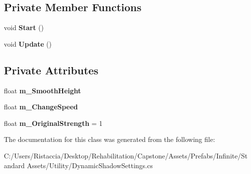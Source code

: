 \subsection*{Private Member Functions}
\begin{DoxyCompactItemize}
\item 
\mbox{\label{class_unity_standard_assets_1_1_utility_1_1_dynamic_shadow_settings_ac1f62e4c76152f36c1fc8b8136231a58}} 
void {\bfseries Start} ()
\item 
\mbox{\label{class_unity_standard_assets_1_1_utility_1_1_dynamic_shadow_settings_a9b0f224d3b26f1d2c0ffd986ab911f85}} 
void {\bfseries Update} ()
\end{DoxyCompactItemize}
\subsection*{Private Attributes}
\begin{DoxyCompactItemize}
\item 
\mbox{\label{class_unity_standard_assets_1_1_utility_1_1_dynamic_shadow_settings_ac7eeebb1fe434f79a0338f4021244954}} 
float {\bfseries m\+\_\+\+Smooth\+Height}
\item 
\mbox{\label{class_unity_standard_assets_1_1_utility_1_1_dynamic_shadow_settings_a5af1b39260b701afb9341ca5d90ffb96}} 
float {\bfseries m\+\_\+\+Change\+Speed}
\item 
\mbox{\label{class_unity_standard_assets_1_1_utility_1_1_dynamic_shadow_settings_a379af252d53f85b397ef8188bf23ef6c}} 
float {\bfseries m\+\_\+\+Original\+Strength} = 1
\end{DoxyCompactItemize}


The documentation for this class was generated from the following file\+:\begin{DoxyCompactItemize}
\item 
C\+:/\+Users/\+Ristaccia/\+Desktop/\+Rehabilitation/\+Capstone/\+Assets/\+Prefabs/\+Infinite/\+Standard Assets/\+Utility/Dynamic\+Shadow\+Settings.\+cs\end{DoxyCompactItemize}
